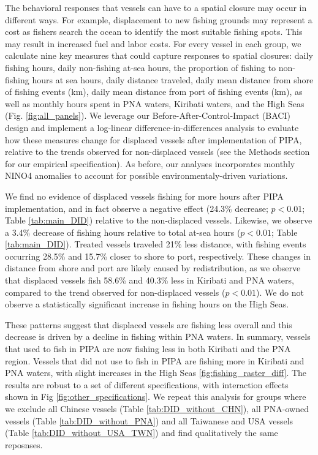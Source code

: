 \documentclass[9p,twocolumn,twoside,lineno]{pnas-new}
\begin{document}
The behavioral responses that vessels can have to a spatial closure may occur in different ways. For example, displacement to new fishing grounds may represent a cost as fishers search the ocean to identify the most suitable fishing spots. This may result in increased fuel and labor costs. For every vessel in each group, we calculate nine key measures that could capture responses to spatial closures: daily fishing hours, daily non-fishing at-sea hours, the proportion of fishing to non-fishing hours at sea hours, daily distance traveled, daily mean distance from shore of fishing events (km), daily mean distance from port of fishing events (km), as well as monthly hours spent in PNA waters, Kiribati waters, and the High Seas (Fig. \ref{fig:all_panels}). We leverage our Before-After-Control-Impact (BACI) design and implement a log-linear difference-in-differences analysis to evaluate how these measures change for displaced vessels after implementation of PIPA, relative to the trends observed for non-displaced vessels (see the Methods section for our empirical specification). As before, our analyses incorporates monthly NINO4 anomalies to account for possible environmentaly-driven variations.

We find no evidence of displaced vessels fishing for more hours after PIPA implementation, and in fact observe a negative effect (24.3\% decrease; $p < 0.01$; Table \ref{tab:main_DID}) relative to the non-displaced vessels. Likewise, we observe a 3.4\% decrease of fishing hours relative to total at-sea hours ($p < 0.01$; Table \ref{tab:main_DID}). Treated vessels traveled 21\% less distance, with fishing events occurring 28.5\% and 15.7\% closer to shore to port, respectively. These changes in distance from shore and port are likely caused by redistribution, as we observe that displaced vessels fish 58.6\% and 40.3\% less in Kiribati and PNA waters, compared to the trend observed for non-displaced vessels ($p < 0.01$). We do not observe a statistically significant increase in fishing hours on the High Seas.

These patterns suggest that displaced vessels are fishing less overall and this decrease is driven by a decline in fishing within PNA waters. In summary, vessels that used to fish in PIPA are now fishing less in both Kiribati and the PNA region. Vessels that did not use to fish in PIPA are fishing more in Kiribati and PNA waters, with slight increases in the High Seas \ref{fig:fishing_raster_diff}. The results are robust to a set of different specifications, with interaction effects shown in Fig  \ref{fig:other_specifications}. We repeat this analysis for groups where we exclude all Chinese vessels (Table \ref{tab:DID_without_CHN}), all PNA-owned vessels (Table \ref{tab:DID_without_PNA}) and all Taiwanese and USA vessels (Table \ref{tab:DID_without_USA_TWN}) and find qualitatively the same reposnses.
\end{document}

